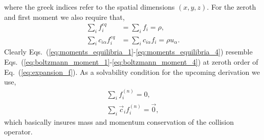 where the greek indices refer to the spatial dimensions $(x,y,z)$. 
For the zeroth and first moment we also require that,
\begin{align}
    \sum_{i} f_{i}^{eq} &= \sum_{i} f_{i} = \rho, \\
    \sum_i c_{i\alpha}f_i^{eq} &= \sum_i c_{i\alpha}f_i = \rho u_{\alpha}.
\end{align}
Clearly Eqs.~(\ref{eq:moments_equilibria_1}-\ref{eq:moments_equilibria_4}) resemble Eqs.~(\ref{eq:boltzmann_moment_1}-\ref{eq:boltzmann_moment_4}) at zeroth order of Eq.~(\ref{eq:expansion_f}).
As a solvability condition for the upcoming derivation we use,
\begin{align}
    \sum_{i} f_{i}^{(n)} = 0, \label{eq:all_order_constraint_1}\\
    \sum_{i} \vec{c}_{i}f_{i}^{(n)} = \vec{0},  \label{eq:all_order_constraint_2}
\end{align}
which basically insures mass and momentum conservation of the collision operator.

